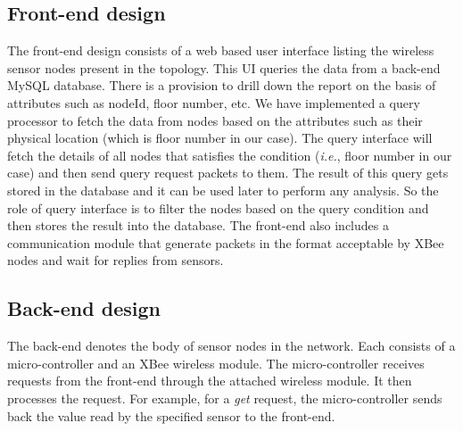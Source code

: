 \subsection{Front-end design}
The front-end design consists of a web based user interface listing the wireless sensor nodes present in the topology. This UI queries the data from a back-end MySQL database. There is a provision to drill down the report on the basis of attributes such as nodeId, floor number, etc.
We have implemented a query processor to fetch the data from nodes based on the attributes such as their physical location (which is floor number in our case). The query interface will fetch the details of all nodes that satisfies the condition (\emph{i.e.}, floor number in our case) and then send query request packets to them. The result of this query gets stored in the database and it can be used later to perform any analysis. So the role of query interface is to filter the nodes based on the query condition and then stores the result into the database. The front-end also includes a communication module that generate packets in the format acceptable by XBee nodes and wait for replies from sensors.


\subsection{Back-end design}
The back-end denotes the body of sensor nodes in the network. Each consists of a micro-controller and an XBee wireless module. The micro-controller receives requests from the front-end through the attached wireless module. It then processes the request. For example, for a \emph{get} request, the micro-controller sends back the value read by the specified sensor to the front-end.

